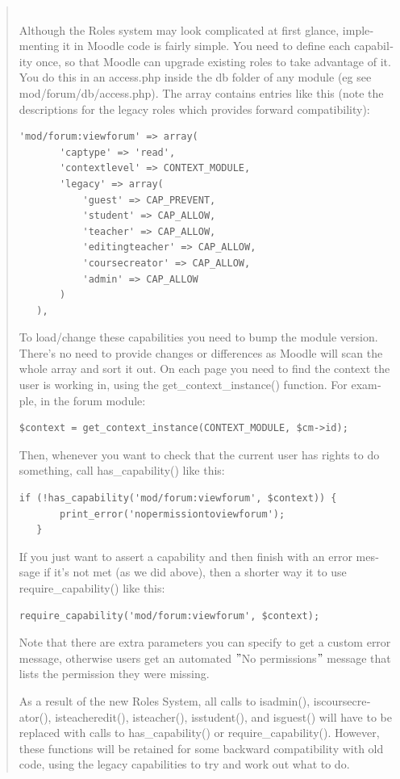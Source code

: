 \documentclass[a4paper]{report}  %
\begin{document}
\begin{otherlanguage}{english}
\begin{quote}
\begin{minipage}{2.51cm}
\end{minipage}
\\
Although the Roles system may look complicated at first glance, implementing it in Moodle code is fairly simple. 
You need to define each capability once, so that Moodle can upgrade existing roles to take advantage of it. You do this in an access.php inside the db folder of any module (eg see mod/forum/db/access.php). The array contains entries like this (note the descriptions for the legacy roles which provides forward compatibility): 
\begin{lstlisting}[style=PHP]
   'mod/forum:viewforum' => array(
       'captype' => 'read',
       'contextlevel' => CONTEXT_MODULE,
       'legacy' => array(
           'guest' => CAP_PREVENT,
           'student' => CAP_ALLOW,
           'teacher' => CAP_ALLOW,
           'editingteacher' => CAP_ALLOW,
           'coursecreator' => CAP_ALLOW,
           'admin' => CAP_ALLOW
       )
   ),
\end{lstlisting}
To load/change these capabilities you need to bump the module version. There's no need to provide changes or differences as Moodle will scan the whole array and sort it out. 
On each page you need to find the context the user is working in, using the get\_context\_instance() function. For example, in the forum module: 
\begin{lstlisting}[style=PHP]
 $context = get_context_instance(CONTEXT_MODULE, $cm->id);
\end{lstlisting}
Then, whenever you want to check that the current user has rights to do something, call has\_capability() like this: 
\begin{lstlisting}[style=PHP]
   if (!has_capability('mod/forum:viewforum', $context)) {
       print_error('nopermissiontoviewforum');
   }
\end{lstlisting}
If you just want to assert a capability and then finish with an error message if it's not met (as we did above), then a shorter way it to use require\_capability() like this: 
\begin{lstlisting}[style=PHP]
   require_capability('mod/forum:viewforum', $context);
\end{lstlisting}
Note that there are extra parameters you can specify to get a custom error message, otherwise users get an automated $"$No permissions$"$ message that lists the permission they were missing. 

As a result of the new Roles System, all calls to isadmin(), iscoursecreator(), isteacheredit(), isteacher(), isstudent(), and isguest() will have to be replaced with calls to has\_capability() or require\_capability(). However, these functions will be retained for some backward compatibility with old code, using the legacy capabilities to try and work out what to do. 
\end{quote}
\end{otherlanguage}
\end{document}

